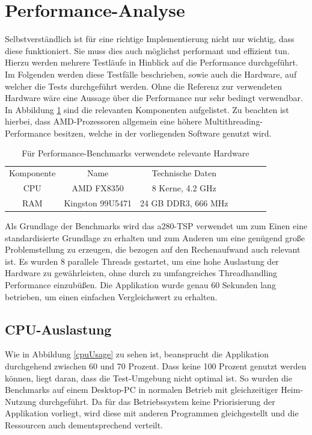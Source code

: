 \section{Performance-Analyse}
Selbstverständlich ist für eine richtige Implementierung nicht nur wichtig, dass diese funktioniert. Sie muss dies auch möglichst performant und effizient tun. Hierzu werden mehrere Testläufe in Hinblick auf die Performance durchgeführt. Im Folgenden werden diese Testfälle beschrieben, sowie auch die Hardware, auf welcher die Tests durchgeführt werden. Ohne die Referenz zur verwendeten Hardware wäre eine Aussage über die Performance nur sehr bedingt verwendbar. In Abbildung \ref{hardware} sind die relevanten Komponenten aufgelistet. Zu beachten ist hierbei, dass AMD-Prozessoren allgemein eine höhere Multithreading-Performance besitzen, welche in der vorliegenden Software genutzt wird.
\begin{table}[H]
	\centering
	\begin{tabular}{c c c c c c c}
		Komponente & Name & Technische Daten\\
		CPU & AMD FX8350 & 8 Kerne, 4.2 GHz\\ 
		RAM & Kingston 99U5471 & 24 GB DDR3, 666 MHz  \\ 
	\end{tabular}
	\caption{Für Performance-Benchmarks verwendete relevante Hardware}
	\label{hardware}
\end{table}
Als Grundlage der Benchmarks wird das a280-\ac{TSP} verwendet um zum Einen eine standardisierte Grundlage zu erhalten und zum Anderen um eine genügend große Problemstellung zu erzeugen, die bezogen auf den Rechenaufwand auch relevant ist. Es wurden 8 parallele Threads gestartet, um eine hohe Auslastung der Hardware zu gewährleisten, ohne durch zu umfangreiches Threadhandling Performance einzubüßen. Die Applikation wurde genau 60 Sekunden lang betrieben, um einen einfachen Vergleichswert zu erhalten.

\newpage
\subsection{CPU-Auslastung}
Wie in Abbildung \ref{cpuUsage} zu sehen ist, beansprucht die Applikation durchgehend zwischen 60 und 70 Prozent. Dass keine 100 Prozent genutzt werden können, liegt daran, dass die Test-Umgebung nicht optimal ist. So wurden die Benchmarks auf einem Desktop-PC in normalen Betrieb mit gleichzeitiger Heim-Nutzung durchgeführt. Da für das Betriebssystem keine Priorisierung der Applikation vorliegt, wird diese mit anderen Programmen gleichgestellt und die Ressourcen auch dementsprechend verteilt.

